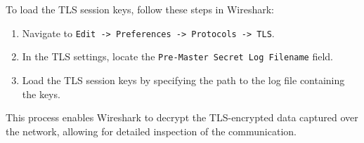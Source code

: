 To load the TLS session keys, follow these steps in Wireshark:

\begin{enumerate}
    \item Navigate to \texttt{Edit -> Preferences -> Protocols -> TLS}.
    \item In the TLS settings, locate the \texttt{Pre-Master Secret Log Filename} field.
    \item Load the TLS session keys by specifying the path to the log file containing the keys.
\end{enumerate}

This process enables Wireshark to decrypt the TLS-encrypted data captured over the network, allowing for detailed inspection of the communication.








